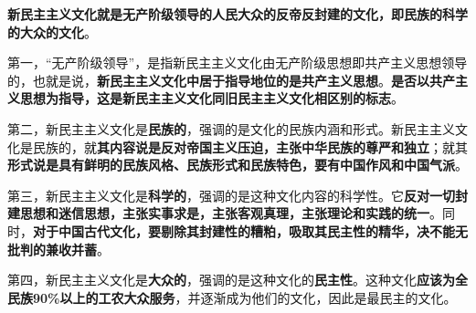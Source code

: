 \textbf{{新民主主义文化就是无产阶级领导的人民大众的反帝反封建的文化，即民族的科学的大众的文化}}。

第一，``无产阶级领导''，是指新民主主义文化由无产阶级思想即共产主义思想领导的，也就是说，\textbf{{新民主主义文化中居于指导地位的是共产主义思想}}。\textbf{{是否以共产主义思想为指导，这是新民主主义文化同旧民主主义文化相区别的标志}}。

第二，新民主主义文化是\textbf{{民族的}}，强调的是文化的民族内涵和形式。新民主主义文化是民族的，就\textbf{{其内容说是反对帝国主义压迫，主张中华民族的尊严和独立}}；就其\textbf{{形式说是具有鲜明的民族风格、民族形式和民族特色，要有中国作风和中国气派}}。

第三，新民主主义文化是\textbf{{科学的}}，强调的是这种文化内容的科学性。它\textbf{{反对一切封建思想和迷信思想，主张实事求是，主张客观真理，主张理论和实践的统一}}。同时，\textbf{{对于中国古代文化，要剔除其封建性的糟粕，吸取其民主性的精华，决不能无批判的兼收并蓄}}。

{第四，新民主主义文化是}\textbf{{大众的}}{，强调的是这种文化的}\textbf{{民主性}}{。这种文化}\textbf{{应该为全民族90\%以上的工农大众服务}}{，并逐渐成为他们的文化，因此是最民主的文化。}
